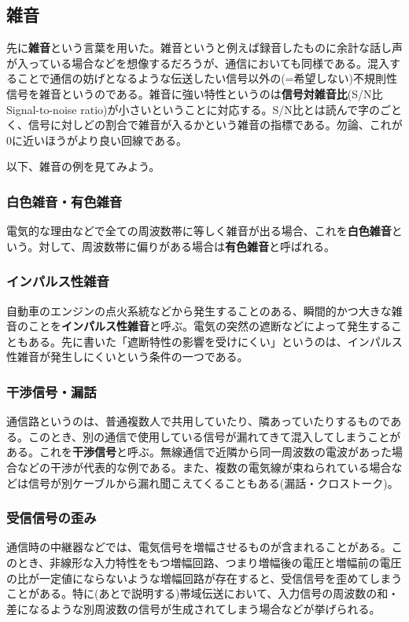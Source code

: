 \subsection{雑音}
先に\textbf{雑音}という言葉を用いた。雑音というと例えば録音したものに余計な話し声が入っている場合などを想像するだろうが、通信においても同様である。混入することで通信の妨げとなるような伝送したい信号以外の(=希望しない)不規則性信号を雑音というのである。雑音に強い特性というのは\textbf{信号対雑音比}(S/N比Signal-to-noise ratio)が小さいということに対応する。S/N比とは読んで字のごとく、信号に対しどの割合で雑音が入るかという雑音の指標である。勿論、これが0に近いほうがより良い回線である。

以下、雑音の例を見てみよう。

\subsubsection{白色雑音・有色雑音}
電気的な理由などで全ての周波数帯に等しく雑音が出る場合、これを\textbf{白色雑音}という。対して、周波数帯に偏りがある場合は\textbf{有色雑音}と呼ばれる。

\subsubsection{インパルス性雑音}
自動車のエンジンの点火系統などから発生することのある、瞬間的かつ大きな雑音のことを\textbf{インパルス性雑音}と呼ぶ。電気の突然の遮断などによって発生することもある。先に書いた「遮断特性の影響を受けにくい」というのは、インパルス性雑音が発生しにくいという条件の一つである。

\subsubsection{干渉信号・漏話}
通信路というのは、普通複数人で共用していたり、隣あっていたりするものである。このとき、別の通信で使用している信号が漏れてきて混入してしまうことがある。これを\textbf{干渉信号}と呼ぶ。無線通信で近隣から同一周波数の電波があった場合などの干渉が代表的な例である。また、複数の電気線が束ねられている場合などは信号が別ケーブルから漏れ聞こえてくることもある(漏話・クロストーク)。

\subsubsection{受信信号の歪み}
通信時の中継器などでは、電気信号を増幅させるものが含まれることがある。このとき、非線形な入力特性をもつ増幅回路、つまり増幅後の電圧と増幅前の電圧の比が一定値にならないような増幅回路が存在すると、受信信号を歪めてしまうことがある。特に(あとで説明する)帯域伝送において、入力信号の周波数の和・差になるような別周波数の信号が生成されてしまう場合などが挙げられる。

